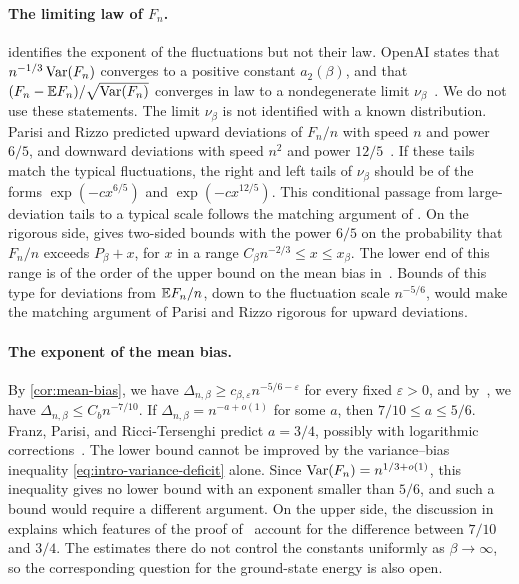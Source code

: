 \paragraph{The limiting law of $F_n$.}
 identifies the exponent of the fluctuations but not their law.
OpenAI states that $n^{-1/3}\operatorname{Var}(F_n)$ converges to a positive constant
$a_2(\beta)$, and that $(F_n-\mathbb E F_n)/\sqrt{\operatorname{Var}(F_n)}$ converges in law to a
nondegenerate limit $\nu_\beta$~\cite[Theorems~1.1 and~1.2]{oai-limiting-law}.
We do not use these statements. The limit $\nu_\beta$ is not identified
with a known distribution. Parisi and Rizzo predicted upward deviations of
$F_n/n$ with speed $n$ and power $6/5$, and downward deviations with speed
$n^2$ and power $12/5$~\cite[equations~(12)--(15)]{parisi-rizzo-2010}. If
these tails match the typical fluctuations, the right and left tails of
$\nu_\beta$ should be of the forms $\exp(-cx^{6/5})$ and $\exp(-cx^{12/5})$.
This conditional passage from large-deviation tails to a typical scale follows
the matching argument of \cite[Section~VI]{parisi-rizzo-2009}.
On the rigorous side, \cite[Theorem~1.5]{quantitative-parisi} gives two-sided
bounds with the power $6/5$ on the probability that $F_n/n$ exceeds
$P_\beta+x$, for $x$ in a range $C_\beta n^{-2/3}\le x\le x_\beta$. The lower
end of this range is of the order of the upper bound on the mean bias
in~\cite[Theorem~1.4]{quantitative-parisi}. Bounds of this type for
deviations from $\mathbb E F_n/n$, down to the fluctuation scale $n^{-5/6}$, would
make the matching argument of Parisi and Rizzo rigorous for upward
deviations.

\paragraph{The exponent of the mean bias.}
By \cref{cor:mean-bias}, we have
$\Delta_{n,\beta}\ge c_{\beta,\varepsilon}n^{-5/6-\varepsilon}$ for every
fixed $\varepsilon>0$, and by~\cite[Theorem~1.1]{hexagon-bias}, we have
$\Delta_{n,\beta}\le C_b n^{-7/10}$. If
$\Delta_{n,\beta}=n^{-a+o(1)}$ for some $a$, then $7/10\le a\le5/6$. Franz,
Parisi, and Ricci-Tersenghi predict $a=3/4$, possibly with logarithmic
corrections~\cite{franz-parisi-ricci-2026}. The lower bound
cannot be improved by the variance--bias inequality
\eqref{eq:intro-variance-deficit} alone. Since $\operatorname{Var}(F_n)=n^{1/3+o(1)}$, this
inequality gives no lower bound with an exponent smaller than $5/6$, and such
a bound would require a different argument. On the upper side, the
discussion in~\cite[Section~1.4]{hexagon-bias} explains which features of the
proof of~\cite[Theorem~1.1]{hexagon-bias} account for the difference between
$7/10$ and $3/4$. The estimates there do not control the
constants uniformly as $\beta\to\infty$, so the corresponding question for the
ground-state energy is also open.
